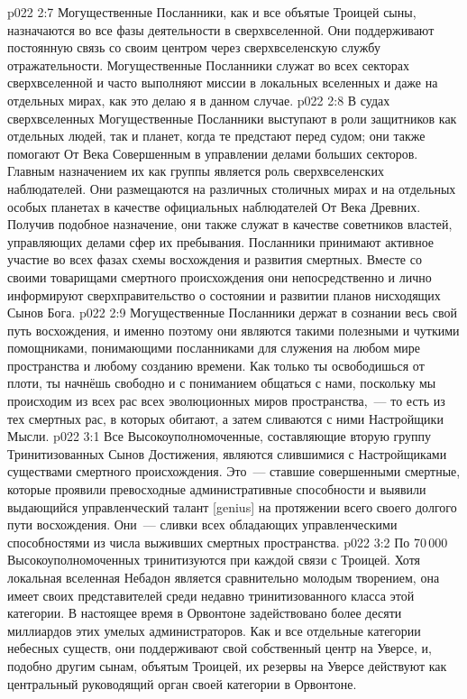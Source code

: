 \vs p022 2:7 \pc Могущественные Посланники, как и все объятые Троицей сыны, назначаются во все фазы деятельности в сверхвселенной. Они поддерживают постоянную связь со своим центром через сверхвселенскую службу отражательности. Могущественные Посланники служат во всех секторах сверхвселенной и часто выполняют миссии в локальных вселенных и даже на отдельных мирах, как это делаю я в данном случае.
\vs p022 2:8 В судах сверхвселенных Могущественные Посланники выступают в роли защитников как отдельных людей, так и планет, когда те предстают перед судом; они также помогают От Века Совершенным в управлении делами больших секторов. Главным назначением их как группы является роль сверхвселенских наблюдателей. Они размещаются на различных столичных мирах и на отдельных особых планетах в качестве официальных наблюдателей От Века Древних. Получив подобное назначение, они также служат в качестве советников властей, управляющих делами сфер их пребывания. Посланники принимают активное участие во всех фазах схемы восхождения и развития смертных. Вместе со своими товарищами смертного происхождения они непосредственно и лично информируют сверхправительство о состоянии и развитии планов нисходящих Сынов Бога.
\vs p022 2:9 Могущественные Посланники держат в сознании весь свой путь восхождения, и именно поэтому они являются такими полезными и чуткими помощниками, понимающими посланниками для служения на любом мире пространства и любому созданию времени. Как только ты освободишься от плоти, ты начнёшь свободно и с пониманием общаться с нами, поскольку мы происходим из всех рас всех эволюционных миров пространства,~--- то есть из тех смертных рас, в которых обитают, а затем сливаются с ними Настройщики Мысли.
\vs p022 3:1 Все Высокоуполномоченные, составляющие вторую группу Тринитизованных Сынов Достижения, являются слившимися с Настройщиками существами смертного происхождения. Это~--- ставшие совершенными смертные, которые проявили превосходные административные способности и выявили выдающийся управленческий талант [genius] на протяжении всего своего долгого пути восхождения. Они~--- сливки всех обладающих управленческими способностями из числа выживших смертных пространства.
\vs p022 3:2 По 70\,000 Высокоуполномоченных тринитизуются при каждой связи с Троицей. Хотя локальная вселенная Небадон является сравнительно молодым творением, она имеет своих представителей среди недавно тринитизованного класса этой категории. В настоящее время в Орвонтоне задействовано более десяти миллиардов этих умелых администраторов. Как и все отдельные категории небесных существ, они поддерживают свой собственный центр на Уверсе, и, подобно другим сынам, объятым Троицей, их резервы на Уверсе действуют как центральный руководящий орган своей категории в Орвонтоне.
